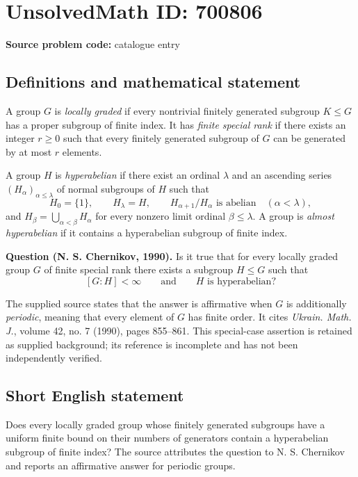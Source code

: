 \documentclass[11pt]{article}
\begin{document}
\section*{UnsolvedMath ID: 700806}
\textbf{Source problem code:} catalogue entry
\subsection{Definitions and mathematical statement}
A group \(G\) is \emph{locally graded} if every nontrivial finitely generated subgroup \(K\leq G\) has a proper subgroup of finite index. It has \emph{finite special rank} if there exists an integer \(r\geq 0\) such that every finitely generated subgroup of \(G\) can be generated by at most \(r\) elements.

A group \(H\) is \emph{hyperabelian} if there exist an ordinal \(\lambda\) and an ascending series \((H_\alpha)_{\alpha\leq\lambda}\) of normal subgroups of \(H\) such that
\[
H_0=\{1\},\qquad H_\lambda=H,\qquad
H_{\alpha+1}/H_\alpha\text{ is abelian}\quad(\alpha<\lambda),
\]
and \(H_\beta=\bigcup_{\alpha<\beta}H_\alpha\) for every nonzero limit ordinal \(\beta\leq\lambda\). A group is \emph{almost hyperabelian} if it contains a hyperabelian subgroup of finite index.

\textbf{Question (N. S. Chernikov, 1990).} Is it true that for every locally graded group \(G\) of finite special rank there exists a subgroup \(H\leq G\) such that
\[
[G:H]<\infty\qquad\text{and}\qquad H\text{ is hyperabelian}?
\]

The supplied source states that the answer is affirmative when \(G\) is additionally \emph{periodic}, meaning that every element of \(G\) has finite order. It cites \emph{Ukrain. Math. J.}, volume 42, no. 7 (1990), pages 855--861. This special-case assertion is retained as supplied background; its reference is incomplete and has not been independently verified.
\subsection{Short English statement}
Does every locally graded group whose finitely generated subgroups have a uniform finite bound on their numbers of generators contain a hyperabelian subgroup of finite index? The source attributes the question to N. S. Chernikov and reports an affirmative answer for periodic groups.
\end{document}
